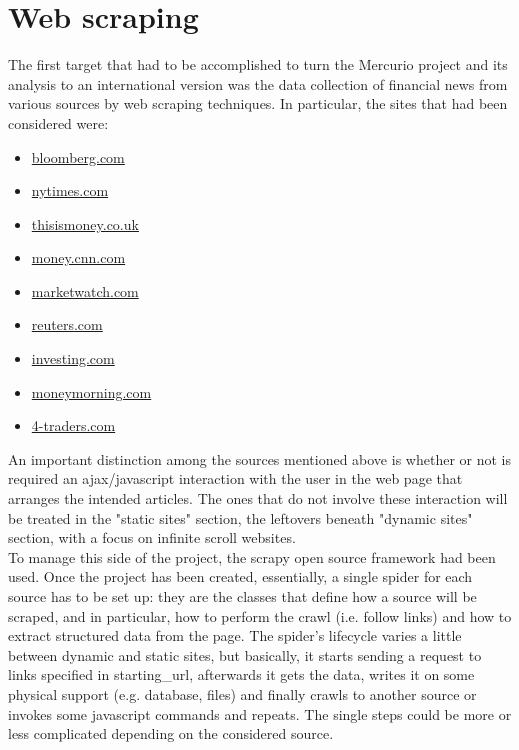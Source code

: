 \section{Web scraping}
The first target that had to be accomplished to turn the Mercurio project and its analysis to an international version was the data collection of financial news from various sources by web scraping techniques. In particular, the sites that had been considered were: 
\begin{itemize}
\item \href{https://www.bloomberg.com}{bloomberg.com}
\item \href{https://www.nytimes.com}{nytimes.com}
\item \href{https://www.thisismoney.co.uk}{thisismoney.co.uk}
\item \href{http://money.cnn.com}{money.cnn.com}
\item \href{http://www.marketwatch.com}{marketwatch.com}
\item \href{http://www.reuters.com}{reuters.com}
\item \href{http://www.investing.com}{investing.com}
\item \href{http://www.moneymorning.com}{moneymorning.com} 
\item \href{http://www.4-traders.com/}{4-traders.com}
\end{itemize}
An important distinction among the sources mentioned above is whether or not is required an ajax/javascript interaction with the user in the web page that arranges the intended articles. The ones that do  not involve these interaction will be treated in the "static sites" section, the leftovers beneath "dynamic sites" section, with a focus on infinite scroll websites. \\ 
To manage this side of the project, the scrapy open source framework \cite{scrapyframework} had been used. %
Once the project has been created, essentially, a single spider \cite{scrapyspider} for each source has to be set up: they are the classes that define how a source will be scraped, and in particular, how to perform the crawl (i.e. follow links) and how to extract structured data from the page. The spider's lifecycle varies a little between dynamic and static sites, but basically, it starts sending a request to links specified in starting\_url, afterwards it gets the data, writes it on some physical support (e.g. database, files) and finally crawls to another source or invokes some javascript commands and repeats. The single steps could be more or less complicated depending on the considered source. \\
